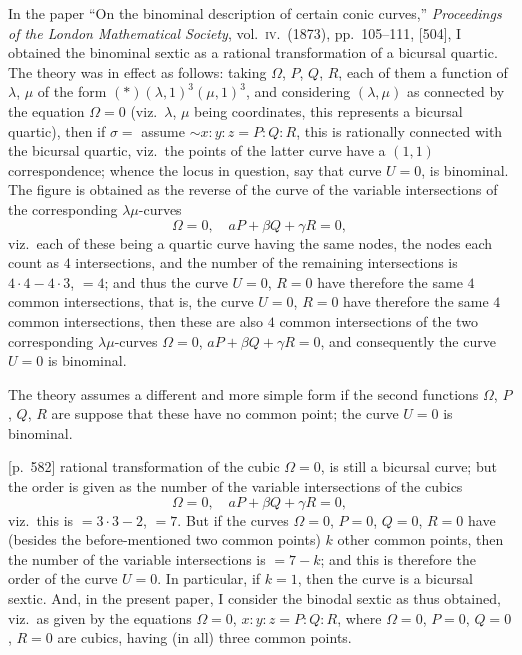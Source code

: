 \documentclass[11pt,a4paper]{article}
\theoremstyle{plain}
\theoremstyle{definition}
\theoremstyle{remark}
\begin{document}
\bigskip

In the paper ``On the binominal description of certain conic curves,'' \textit{Proceedings of the London Mathematical Society}, vol.\ \textsc{iv}.\ (1873), pp.~105--111, [504], I obtained the binominal sextic as a rational transformation of a bicursal quartic. The theory was in effect as follows: taking $\Omega$, $P$, $Q$, $R$, each of them a function of $\lambda$, $\mu$ of the form $(*)(\lambda, 1)^3 (\mu, 1)^3$, and considering $(\lambda, \mu)$ as connected by the equation $\Omega = 0$ (viz.\ $\lambda$, $\mu$ being coordinates, this represents a bicursal quartic), then if $\sigma = $ assume $\sim x : y : z = P : Q : R$, this is rationally connected with the bicursal quartic, viz.\ the points of the latter curve have a $(1, 1)$ correspondence; whence the locus in question, say that curve $U = 0$, is binominal. The figure is obtained as the reverse of the curve of the variable intersections of the corresponding $\lambda\mu$-curves
\[
\Omega = 0, \quad aP + \beta Q + \gamma R = 0,
\]
viz.\ each of these being a quartic curve having the same nodes, the nodes each count as $4$ intersections, and the number of the remaining intersections is $4 \cdot 4 - 4 \cdot 3$, $= 4$; and thus the curve $U = 0$, $R = 0$ have therefore the same $4$ common intersections, that is, the curve $U = 0$, $R = 0$ have therefore the same $4$ common intersections, then these are also $4$ common intersections of the two corresponding $\lambda\mu$-curves $\Omega = 0$, $aP + \beta Q + \gamma R = 0$, and consequently the curve $U = 0$ is binominal.

The theory assumes a different and more simple form if the second functions $\Omega$, $P$, $Q$, $R$ are suppose that these have no common point; the curve $U = 0$ is binominal.

\bigskip

[p.~582] rational transformation of the cubic $\Omega = 0$, is still a bicursal curve; but the order is given as the number of the variable intersections of the cubics
\[
\Omega = 0, \quad aP + \beta Q + \gamma R = 0,
\]
viz.\ this is $= 3 \cdot 3 - 2$, $= 7$. But if the curves $\Omega = 0$, $P = 0$, $Q = 0$, $R = 0$ have (besides the before-mentioned two common points) $k$ other common points, then the number of the variable intersections is $= 7 - k$; and this is therefore the order of the curve $U = 0$. In particular, if $k = 1$, then the curve is a bicursal sextic. And, in the present paper, I consider the binodal sextic as thus obtained, viz.\ as given by the equations $\Omega = 0$, $x : y : z = P : Q : R$, where $\Omega = 0$, $P = 0$, $Q = 0$, $R = 0$ are cubics, having (in all) three common points.
\end{document}
